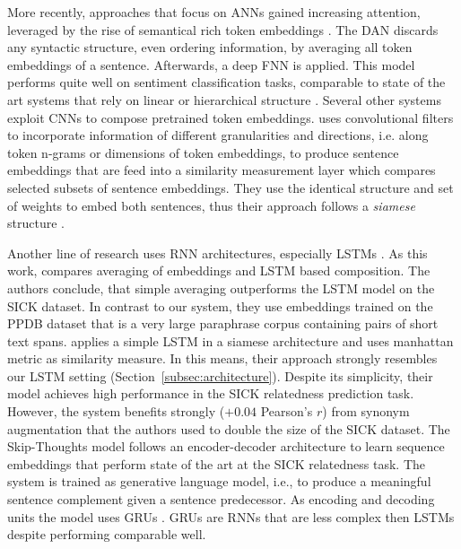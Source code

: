 More recently, approaches that focus on \aclp{ANN} gained increasing attention, leveraged by the rise of semantical rich token embeddings \autocite{mikolov_distributed_2013, pennington_glove_2014, wieting_paraphrase_2015}. The \acf{DAN} \autocite{iyyer_deep_2015} discards any syntactic structure, even ordering information, by averaging all token embeddings of a sentence. Afterwards, a deep \ac{FNN} is applied. This model performs quite well on sentiment classification  tasks, comparable to state of the art systems that rely on linear \autocite{kim_convolutional_2014} or hierarchical structure \autocite{tai_improved_2015}. Several other systems \autocite{kim_convolutional_2014,kalchbrenner_convolutional_2014,hu_convolutional_2014,yin_convolutional_2015,he_multi-perspective_2015} exploit \acfp{CNN} \autocite{lecun_convolutional_1995} to compose pretrained token embeddings. \textcite{he_multi-perspective_2015} uses convolutional filters to incorporate information of different granularities and directions, i.e. along token n-grams or dimensions of token embeddings, to produce sentence embeddings that are feed into a similarity measurement layer which compares selected subsets of sentence embeddings. They use the identical structure and set of weights to embed both sentences, thus their approach follows a \textit{siamese} structure \autocite{bromley_signature_1994}. %

Another line of research uses \ac{RNN} architectures, especially \acfp{LSTM} \autocite{wieting_towards_2015,liu_multi-timescale_2015,mueller_siamese_2016}. As this work, \textcite{wieting_towards_2015} compares averaging of embeddings and \ac{LSTM} based composition. The authors conclude, that simple averaging outperforms the \ac{LSTM} model on the SICK dataset. In contrast to our system, they use embeddings trained on the PPDB \autocite{ganitkevitch_ppdb_2013} dataset that is a very large paraphrase corpus containing pairs of short text spans. \textcite{mueller_siamese_2016} applies a simple \ac{LSTM} in a siamese architecture and uses manhattan metric as similarity measure. In this means, their approach strongly resembles our \ac{LSTM} setting (Section~\ref{subsec:architecture}). Despite its simplicity, their model achieves high performance in the SICK relatedness prediction task. However, the system benefits strongly ($+0.04$ Pearson's $r$) from synonym augmentation that the authors used to double the size of the SICK dataset.
The Skip-Thoughts \autocite{kiros_skip-thought_2015} model follows an encoder-decoder architecture to learn sequence embeddings that perform state of the art at the SICK relatedness task. The system is trained as generative language model, i.e., to produce a meaningful sentence complement given a sentence predecessor. As encoding and decoding units the model uses \acfp{GRU} \autocite{cho_learning_2014}. \acp{GRU} are \acp{RNN} that are less complex then \acp{LSTM} despite performing comparable well. 

